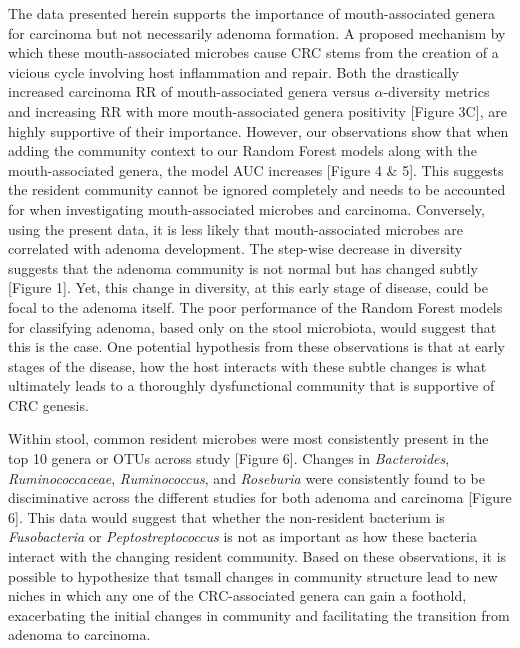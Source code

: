 \documentclass[12pt,]{article}
\begin{document}
The data presented herein supports the importance of mouth-associated
genera for carcinoma but not necessarily adenoma formation. A proposed
mechanism by which these mouth-associated microbes cause CRC stems from
the creation of a vicious cycle involving host inflammation and repair.
Both the drastically increased carcinoma RR of mouth-associated genera
versus \(\alpha\)-diversity metrics and increasing RR with more
mouth-associated genera positivity {[}Figure 3C{]}, are highly
supportive of their importance. However, our observations show that when
adding the community context to our Random Forest models along with the
mouth-associated genera, the model AUC increases {[}Figure 4 \& 5{]}.
This suggests the resident community cannot be ignored completely and
needs to be accounted for when investigating mouth-associated microbes
and carcinoma. Conversely, using the present data, it is less likely
that mouth-associated microbes are correlated with adenoma development.
The step-wise decrease in diversity suggests that the adenoma community
is not normal but has changed subtly {[}Figure 1{]}. Yet, this change in
diversity, at this early stage of disease, could be focal to the adenoma
itself. The poor performance of the Random Forest models for classifying
adenoma, based only on the stool microbiota, would suggest that this is
the case. One potential hypothesis from these observations is that at
early stages of the disease, how the host interacts with these subtle
changes is what ultimately leads to a thoroughly dysfunctional community
that is supportive of CRC genesis.

Within stool, common resident microbes were most consistently present in
the top 10 genera or OTUs across study {[}Figure 6{]}. Changes in
\emph{Bacteroides}, \emph{Ruminococcaceae}, \emph{Ruminococcus}, and
\emph{Roseburia} were consistently found to be disciminative across the
different studies for both adenoma and carcinoma {[}Figure 6{]}. This
data would suggest that whether the non-resident bacterium is
\emph{Fusobacteria} or \emph{Peptostreptococcus} is not as important as
how these bacteria interact with the changing resident community. Based
on these observations, it is possible to hypothesize that tsmall changes
in community structure lead to new niches in which any one of the
CRC-associated genera can gain a foothold, exacerbating the initial
changes in community and facilitating the transition from adenoma to
carcinoma.
\end{document}

